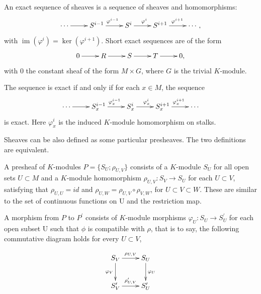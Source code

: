 \documentclass[twoside]{article}
\begin{document}
\begin{definition}
An exact sequence of sheaves is a sequence of sheaves and homomorphisms:
\begin{equation*}
  \xymatrix{
 \cdots\ar[r]&S^{i-1}\ar[r]^{\varphi^{i-1}}&S^i\ar[r]^{\varphi^{i}}&S^{i+1}\ar[r]^{\varphi^{i+1}}&\cdots,\\
  }
\end{equation*}
 with $\operatorname{im}(\varphi^{i})=\ker(\varphi^{i+1})$. Short exact sequences are of the form
  \begin{equation*}
  \xymatrix{
 0\ar[r]&R\ar[r]&S\ar[r]&T\ar[r]&0,\\
  }
\end{equation*}
  with $0$ the constant sheaf of the form $M\times G$, where $G$ is the trivial $K$-module.
\end{definition}

  The sequence is exact if and only if for each $x\in M$, the sequence
 \begin{equation*}
  \xymatrix{
 \cdots\ar[r]&S_x^{i-1}\ar[r]^{\varphi_x^{i-1}}&S_x^i\ar[r]^{\varphi_x^{i}}&S_x^{i+1}\ar[r]^{\varphi_x^{i+1}}&\cdots\\
  }
\end{equation*} is exact. Here $\varphi_x^{i}$ is the induced $K$-module homomorphism on stalks.


Sheaves can be also defined as some particular presheaves. The two definitions are equivalent.

\begin{definition}
  A presheaf of $K$-modules $P=\{S_U;\rho_{U,V}\}$ consists of a $K$-module $S_U$ for all open sets $U\subset M$ and  a $K$-module homomorphism $\rho_{U,V}\colon S_V\to S_U$ for each $U\subset V$, satisfying that $\rho_{U,U}=id$ and  $\rho_{U,W}=\rho_{U,V}\circ \rho_{V,W}$, for $U\subset V\subset W$. These are similar to  the set of continuous functions on U and  the restriction map.

  A morphism from $P$ to $P^\prime$ consists of  $K$-module morphisms $\varphi_U:S_U\to S_U^\prime$ for each open subset U such that $\phi$ is compatible with $\rho$, that is to say,  the following commutative diagram holds for every $U\subset V$,

  \begin{equation*}
    \xymatrix{
    S_V\ar[r]^{\rho_{U,V}}\ar[d]_{\varphi_V}&S_U\ar[d]^{\varphi_U}\\
    S_V^\prime\ar[r]^{\rho_{U,V}^\prime}&S_U^\prime\\
    }
  \end{equation*}

\end{definition}
\end{document}
